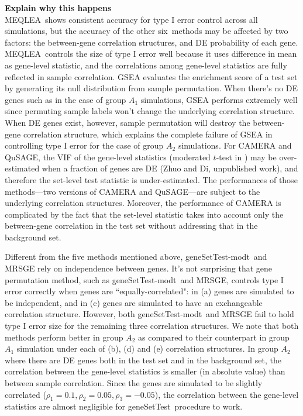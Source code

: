 \documentclass[useAMS,usenatbib, galley]{biom}
\newcommand{\OurMethod}{MEQLEA}
\newcommand{\HowmanyTest}{six}
\newcommand{\aaCase}{a}
\newcommand{\aCase}{b}
\newcommand{\cCase}{c}
\newcommand{\eCase}{d}
\newcommand{\fCase}{e}
\newcommand{\gent}{geneSetTest-modt}
\newcommand{\gen}{geneSetTest}
\newcommand{\thepapertobefinished}{Zhuo and Di, unpublished work}
\begin{document}
	\textbf{Explain why this happens}\\
	\OurMethod~shows consistent accuracy for type I error control across all simulations, but the accuracy of the other \HowmanyTest~methods may be affected by two factors: the between-gene correlation structures, and DE probability of each gene. \OurMethod~controls the size of type I error well because it uses difference in mean as gene-level statistic, and the correlations among gene-level statistics are fully reflected in sample correlation. GSEA evaluates the enrichment score of a test set by generating its null distribution from sample permutation. When there's no DE genes such as in the case of group $A_1$ simulations, GSEA performs extremely well since permuting sample labels won't change the underlying correlation structure. When DE genes exist, however, sample permutation will destroy the between-gene correlation structure, which explains the complete failure of GSEA in controlling type I error for the case of group $A_2$ simulations. For CAMERA and QuSAGE, the VIF of the gene-level statistics (moderated $t$-test in \cite{wu2012camera}) may be over-estimated when a fraction of genes are DE (\thepapertobefinished), and therefore the set-level test statistic is under-estimated. The performances of those methods---two versions of CAMERA and QuSAGE---are subject to the underlying correlation structures. Moreover, the performance of CAMERA is complicated by the fact that the set-level statistic takes into account only the between-gene correlation in the test set without addressing that in the background set.
	
	Different from the five methods mentioned above, \gent~and MRSGE rely on independence between genes. It's not surprising that gene permutation method, such as \gent~and MRSGE, controls type I error correctly when genes are ``equally-correlated": in (\aaCase) genes are simulated to be independent, and in (\cCase) genes are simulated to have an exchangeable correlation structure. However, both \gent~and MRSGE fail to hold type I error size for the remaining three correlation structures. We note that both methods perform better in group $A_2$ as compared to their counterpart in group $A_1$ simulation under each of (\aCase), (\eCase) and (\fCase) correlation structures. In group $A_2$ where there are DE genes both in the test set and in the background set, the correlation between the gene-level statistics is smaller (in absolute value) than between sample correlation. Since the genes are simulated to be slightly correlated ($\rho_1=0.1, \rho_2 = 0.05, \rho_3 = -0.05$), the correlation between the gene-level statistics are almost negligible for \gen~procedure to work. 
	
\end{document}
